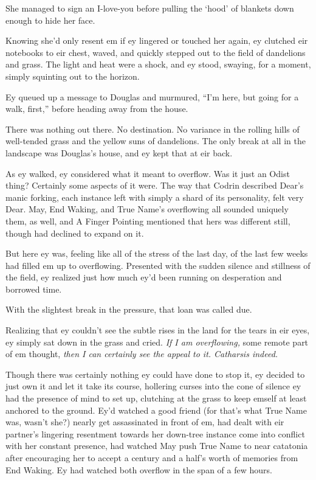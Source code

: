 She managed to sign an I-love-you before pulling the `hood' of blankets down enough to hide her face.

Knowing she'd only resent em if ey lingered or touched her again, ey clutched eir notebooks to eir chest, waved, and quickly stepped out to the field of dandelions and grass. The light and heat were a shock, and ey stood, swaying, for a moment, simply squinting out to the horizon.

Ey queued up a message to Douglas and murmured, ``I'm here, but going for a walk, first,'' before heading away from the house.

There was nothing out there. No destination. No variance in the rolling hills of well-tended grass and the yellow suns of dandelions. The only break at all in the landscape was Douglas's house, and ey kept that at eir back.

As ey walked, ey considered what it meant to overflow. Was it just an Odist thing? Certainly some aspects of it were. The way that Codrin described Dear's manic forking, each instance left with simply a shard of its personality, felt very Dear. May, End Waking, and True Name's overflowing all sounded uniquely them, as well, and A Finger Pointing mentioned that hers was different still, though had declined to expand on it.

But here ey was, feeling like all of the stress of the last day, of the last few weeks had filled em up to overflowing. Presented with the sudden silence and stillness of the field, ey realized just how much ey'd been running on desperation and borrowed time.

With the slightest break in the pressure, that loan was called due.

Realizing that ey couldn't see the subtle rises in the land for the tears in eir eyes, ey simply sat down in the grass and cried. \emph{If I am overflowing,} some remote part of em thought, \emph{then I can certainly see the appeal to it. Catharsis indeed.}

Though there was certainly nothing ey could have done to stop it, ey decided to just own it and let it take its course, hollering curses into the cone of silence ey had the presence of mind to set up, clutching at the grass to keep emself at least anchored to the ground. Ey'd watched a good friend (for that's what True Name was, wasn't she?) nearly get assassinated in front of em, had dealt with eir partner's lingering resentment towards her down-tree instance come into conflict with her constant presence, had watched May push True Name to near catatonia after encouraging her to accept a century and a half's worth of memories from End Waking. Ey had watched both overflow in the span of a few hours.

